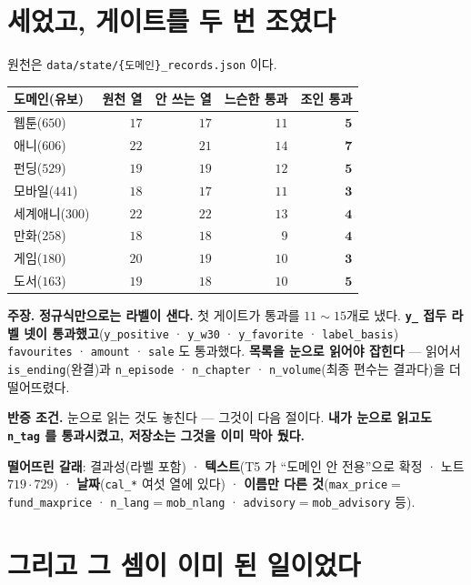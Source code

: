 \documentclass[10pt,a4paper]{article}
\newcommand{\claim}[2]{\begin{claimbox}\textbf{주장.} #1\par\smallskip
  \textcolor{gray!70}{\textbf{반증 조건.} #2}\end{claimbox}}
\begin{document}
\section{세었고, 게이트를 두 번 조였다}

원천은 \texttt{data/state/\{도메인\}\_records.json} 이다.

\begin{center}
\begin{tabular}{lrrrr}
\toprule
도메인(유보) & 원천 열 & 안 쓰는 열 & 느슨한 통과 & \textbf{조인 통과} \\
\midrule
웹툰($650$) & $17$ & $17$ & $11$ & $\mathbf{5}$ \\
애니($606$) & $22$ & $21$ & $14$ & $\mathbf{7}$ \\
펀딩($529$) & $19$ & $19$ & $12$ & $\mathbf{5}$ \\
모바일($441$) & $18$ & $17$ & $11$ & $\mathbf{3}$ \\
세계애니($300$) & $22$ & $22$ & $13$ & $\mathbf{4}$ \\
만화($258$) & $18$ & $18$ & $9$ & $\mathbf{4}$ \\
게임($180$) & $20$ & $19$ & $10$ & $\mathbf{3}$ \\
도서($163$) & $19$ & $18$ & $10$ & $\mathbf{5}$ \\
\bottomrule
\end{tabular}
\end{center}

\claim{\textbf{정규식만으로는 라벨이 샌다.} 첫 게이트가 통과를 $11{\sim}15$개로 냈다.
\textbf{\texttt{y\_} 접두 라벨 넷이 통과했고}(\texttt{y\_positive} · \texttt{y\_w30} ·
\texttt{y\_favorite} · \texttt{label\_basis}) \texttt{favourites} · \texttt{amount} ·
\texttt{sale} 도 통과했다. \textbf{목록을 눈으로 읽어야 잡힌다} --- 읽어서
\texttt{is\_ending}(완결)과 \texttt{n\_episode} · \texttt{n\_chapter} ·
\texttt{n\_volume}(최종 편수는 결과다)을 더 떨어뜨렸다.}
{눈으로 읽는 것도 놓친다 --- 그것이 다음 절이다. \textbf{내가 눈으로 읽고도
\texttt{n\_tag} 를 통과시켰고, 저장소는 그것을 이미 막아 뒀다.}}

\textbf{떨어뜨린 갈래}: 결과성(라벨 포함) · \textbf{텍스트}(T5 가 ``도메인 안 전용''으로
확정 · 노트 $719 \cdot 729$) · \textbf{날짜}(\texttt{cal\_*} 여섯 열에 있다) ·
\textbf{이름만 다른 것}(\texttt{max\_price}$=$\texttt{fund\_maxprice} ·
\texttt{n\_lang}$=$\texttt{mob\_nlang} · \texttt{advisory}$=$\texttt{mob\_advisory} 등).

\section{그리고 그 셈이 이미 된 일이었다}
\end{document}
